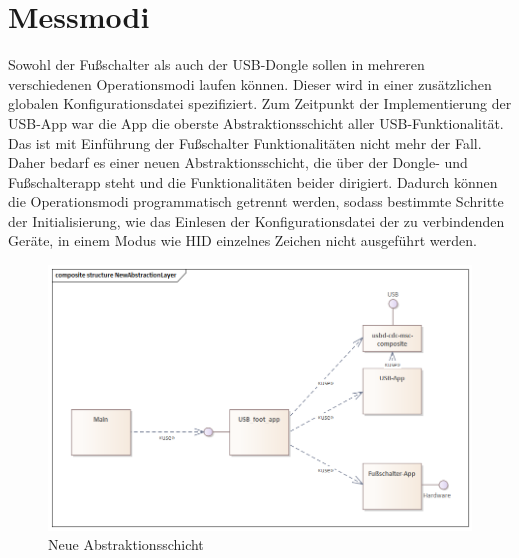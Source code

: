 \section{Messmodi}
Sowohl der Fußschalter als auch der USB-Dongle sollen in mehreren verschiedenen Operationsmodi laufen können. Dieser wird in einer zusätzlichen globalen Konfigurationsdatei spezifiziert. Zum Zeitpunkt der Implementierung der USB-App war die App die oberste Abstraktionsschicht aller USB-Funktionalität. Das ist mit Einführung der Fußschalter Funktionalitäten nicht mehr der Fall. Daher bedarf es einer neuen Abstraktionsschicht, die über der Dongle- und Fußschalterapp steht und die Funktionalitäten beider dirigiert. Dadurch können die Operationsmodi programmatisch getrennt werden, sodass bestimmte Schritte der Initialisierung, wie das Einlesen der Konfigurationsdatei der zu verbindenden Geräte, in einem Modus wie HID einzelnes Zeichen nicht ausgeführt werden.

\begin{figure}[H] 
	\centering
	\includegraphics[width=\textwidth]{figures/NewAbstractionLayer.png}
	\caption{Neue Abstraktionsschicht}
\end{figure}

